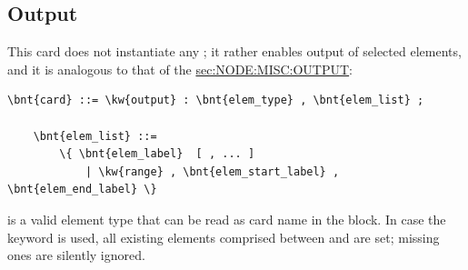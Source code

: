 \subsection{Output}\label{sec:EL:MISC:OUTPUT}
This card does not instantiate any ; it rather enables
output of selected elements, and it is analogous to that of the
\hyperref{\kw{nodes}}{\kw{nodes} (see Section~}{)}{sec:NODE:MISC:OUTPUT}:
\begin{Verbatim}[commandchars=\\\{\}]
    \bnt{card} ::= \kw{output} : \bnt{elem_type} , \bnt{elem_list} ;

    \bnt{elem_list} ::=
        \{ \bnt{elem_label}  [ , ... ]
            | \kw{range} , \bnt{elem_start_label} , \bnt{elem_end_label} \}
\end{Verbatim}
 is a valid element type that can be read 
as card name in the  block.
In case the keyword  is used, all existing elements comprised
between  and 
are set; missing ones are silently ignored.





